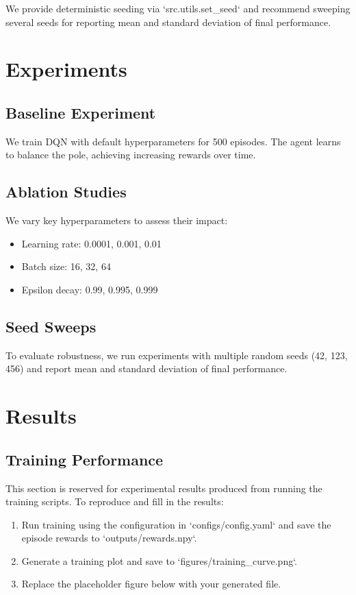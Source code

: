 \documentclass{article}
\begin{document}
We provide deterministic seeding via `src.utils.set_seed` and recommend sweeping several seeds for reporting mean and standard deviation of final performance.
\section{Experiments}

\subsection{Baseline Experiment}

We train DQN with default hyperparameters for 500 episodes. The agent learns to balance the pole, achieving increasing rewards over time.

\subsection{Ablation Studies}

We vary key hyperparameters to assess their impact:
\begin{itemize}
\item Learning rate: 0.0001, 0.001, 0.01
\item Batch size: 16, 32, 64
\item Epsilon decay: 0.99, 0.995, 0.999
\end{itemize}

\subsection{Seed Sweeps}

To evaluate robustness, we run experiments with multiple random seeds (42, 123, 456) and report mean and standard deviation of final performance.

\section{Results}

\subsection{Training Performance}

This section is reserved for experimental results produced from running the training scripts. To reproduce and fill in the results:
\begin{enumerate}
\item Run training using the configuration in `configs/config.yaml` and save the episode rewards to `outputs/rewards.npy`.
\item Generate a training plot and save to `figures/training_curve.png`.
\item Replace the placeholder figure below with your generated file.
\end{enumerate}
\end{document}
